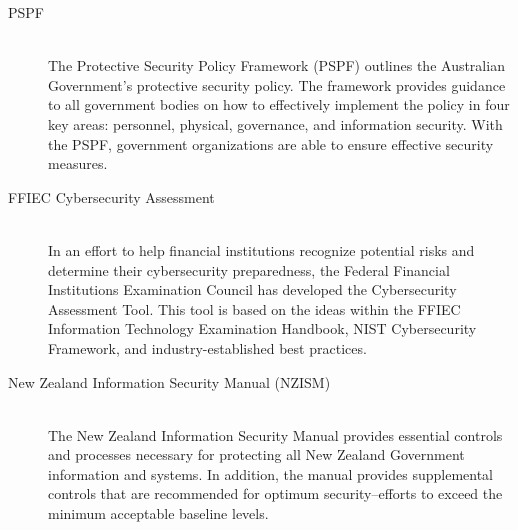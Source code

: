 \begin{description}
     \item[PSPF] \hfill \\
          The Protective Security Policy Framework (PSPF) outlines the Australian Government's protective security policy. The framework provides guidance to all government bodies on how to effectively implement the policy in four key areas: personnel, physical, governance, and information security. With the PSPF, government organizations are able to ensure effective security measures.
     \item[FFIEC Cybersecurity Assessment] \hfill \\
          In an effort to help financial institutions recognize potential risks and determine their cybersecurity preparedness, the Federal Financial Institutions Examination Council has developed the Cybersecurity Assessment Tool. This tool is based on the ideas within the FFIEC Information Technology Examination Handbook, NIST Cybersecurity Framework, and industry-established best practices.
     \item[New Zealand Information Security Manual (NZISM)] \hfill \\
          The New Zealand Information Security Manual provides essential controls and processes necessary for protecting all New Zealand Government information and systems. In addition, the manual provides supplemental controls that are recommended for optimum security--efforts to exceed the minimum acceptable baseline levels.
\end{description}


 
